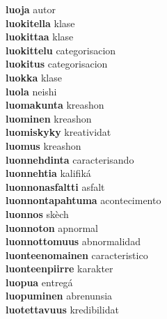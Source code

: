 \textbf{luoja } autor \\
\textbf{luokitella } klase \\
\textbf{luokittaa } klase \\
\textbf{luokittelu } categorisacion \\
\textbf{luokitus } categorisacion \\
\textbf{luokka } klase \\
\textbf{luola } neishi \\
\textbf{luomakunta } kreashon \\
\textbf{luominen } kreashon \\
\textbf{luomiskyky } kreatividat \\
\textbf{luomus } kreashon \\
\textbf{luonnehdinta } caracterisando \\
\textbf{luonnehtia } kalifiká \\
\textbf{luonnonasfaltti } asfalt \\
\textbf{luonnontapahtuma } acontecimento \\
\textbf{luonnos } skèch \\
\textbf{luonnoton } apnormal \\
\textbf{luonnottomuus } abnormalidad \\
\textbf{luonteenomainen } caracteristico \\
\textbf{luonteenpiirre } karakter \\
\textbf{luopua } entregá \\
\textbf{luopuminen } abrenunsia \\
\textbf{luotettavuus } kredibilidat \\
